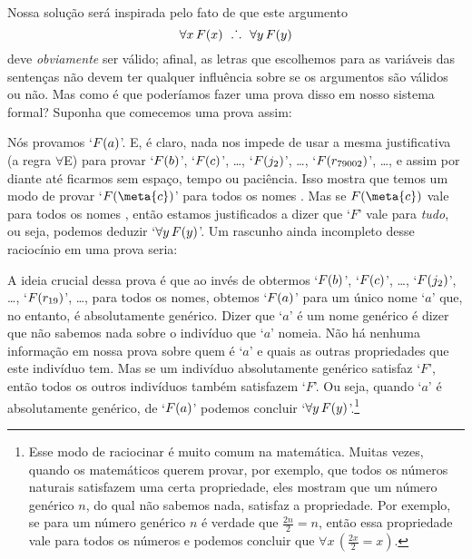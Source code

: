 Nossa solução será inspirada pelo fato de que este argumento
$$\forall x\,\mathord{F}(x) \ \mathrel{\ldotp\dot{}\,\ldotp} \ \forall y\,\mathord{F}(y)$$
deve \emph{obviamente} ser válido; afinal, as letras que escolhemos para as variáveis das sentenças não devem ter qualquer influência sobre se os argumentos são válidos ou não. Mas como é que poderíamos fazer uma prova disso em nosso sistema formal?
Suponha que comecemos uma prova assim:
\begin{fitchproof}
	 
\end{fitchproof}
  Nós provamos `$\mathord{F}(a)$'. E, é claro, nada nos impede de usar a mesma justificativa (a regra $\forall$E) para provar `$\mathord{F}(b)$', `$\mathord{F}(c)$', \ldots, `$\mathord{F}(j_2)$', \ldots, `$\mathord{F}(r_{79002})$', \dots, e assim por diante até ficarmos sem espaço, tempo ou paciência.
  Isso mostra que temos um modo de provar `$\atom{F}{\meta{c}}$' para todos os nomes .
  Mas se $\atom{F}{\meta{c}}$ vale para todos os nomes , então estamos justificados a dizer que `$F$' vale para \textit{tudo}, ou seja, podemos deduzir `$\forall y\,\mathord{F}(y)$'.
  Um rascunho ainda incompleto desse raciocínio em uma prova seria:
\begin{fitchproof}
	 
\end{fitchproof}
A ideia crucial dessa prova é que ao invés de obtermos `$\mathord{F}(b)$', `$\mathord{F}(c)$', \ldots, `$\mathord{F}(j_2)$', \ldots, `$\mathord{F}(r_{19})$', \dots, para todos os nomes, obtemos `$\mathord{F}(a)$' para um único nome `$a$' que, no entanto, é absolutamente genérico.
Dizer que `$a$' é um nome genérico é dizer que não sabemos nada sobre o indivíduo que `$a$' nomeia. Não há nenhuma informação em nossa prova sobre quem é `$a$' e quais as outras propriedades que este indivíduo tem.
Mas se um indivíduo absolutamente genérico satisfaz `$F$', então todos os outros indivíduos também satisfazem `$F$'.
Ou seja, quando `$a$' é absolutamente genérico,  de `$\mathord{F}(a)$' podemos concluir `$\forall y\,\mathord{F}(y)$'.\footnote{
	Esse modo de raciocinar é muito comum na matemática.
	Muitas vezes, quando os matemáticos querem provar, por exemplo, que todos os números naturais satisfazem uma certa propriedade, eles mostram que um número genérico $n$, do qual não sabemos nada, satisfaz a propriedade.
	Por exemplo, se para um número genérico $n$ é verdade que $\frac{2n}{2}=n$, então essa propriedade vale para todos os números e podemos concluir que $\forall x\,(\frac{2x}{2}=x)$.}

